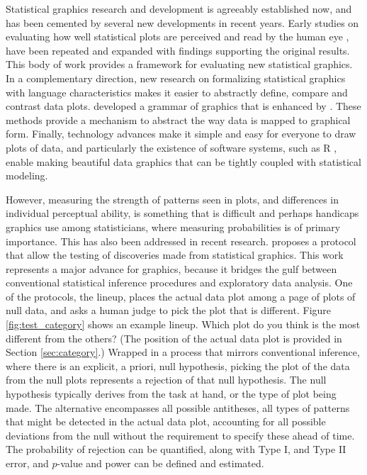 \documentclass{article}
\begin{document}
Statistical graphics research and development is agreeably established now, and has been cemented by several new developments in recent years. Early studies on evaluating how well statistical plots are perceived and read by the human eye \citep{cleveland:1984}, have been repeated and expanded \citep{simkin:1987,spence:1991, heer:2010} with findings supporting the original results. This body of work provides a framework for evaluating new statistical graphics.  In a complementary direction, new research on formalizing statistical graphics with language characteristics makes it easier to abstractly define, compare and contrast data plots. \cite{wilkinson:1999} developed a grammar of graphics that is enhanced by \cite{hadley:2009}. These methods provide a mechanism to abstract the way data is mapped to graphical form. Finally, technology advances make it simple and easy for everyone to draw plots of data, and particularly the existence of software systems, such as R \citep{R}, enable making beautiful data graphics that can be tightly coupled with statistical modeling.

However, measuring the strength of patterns seen in plots, and differences in individual perceptual ability, is something that is difficult and perhaps handicaps graphics  use among statisticians, where measuring probabilities is of primary importance. This has also been addressed in recent research. \citet{buja:2009} proposes a protocol that allow the testing of discoveries made from statistical graphics. This work represents a major advance for graphics, because it bridges the gulf between conventional statistical inference procedures and exploratory data analysis. One of the protocols, the lineup, places the actual data plot among  a page of plots of null data, and asks a human judge to pick the plot that is different. Figure \ref{fig:test_category} shows an example lineup. Which plot do you think is the most different from the others? (The position of the actual data plot is provided in Section \ref{sec:category}.) Wrapped in a process that mirrors conventional inference, where there is an explicit, a priori, null hypothesis, picking the plot of the data from the null plots represents a rejection of that null hypothesis. The null hypothesis typically derives from the task at hand, or the type of plot being made. The alternative encompasses all possible antitheses, all types of patterns that might be detected in the actual data plot, accounting for all possible deviations from the null without the requirement to specify these ahead of time. The probability of rejection can be quantified, along with Type I, and Type II error, and $p$-value and power can be defined and estimated. 
\end{document}
